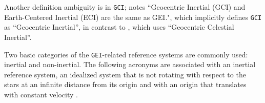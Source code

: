 \documentclass[draft]{agujournal2019}
\begin{document}
Another definition ambiguity is in \texttt{GCI};  notes ``Geocentric Inertial (GCI) and Earth-Centered Inertial (ECI) are the same as GEI.", which implicitly defines \texttt{GCI} as ``Geocentric Inertial'', in contrast to  , which uses ``Geocentric Celestial Inertial''. 

Two basic categories of the \texttt{GEI}-related reference systems are commonly used: inertial and non-inertial. The following acronyms are associated with an inertial reference system, an idealized system that is not rotating with respect to the stars at an infinite distance from its origin and with an origin that translates with constant velocity \cite{NAIFOverview2023}.
\end{document}
